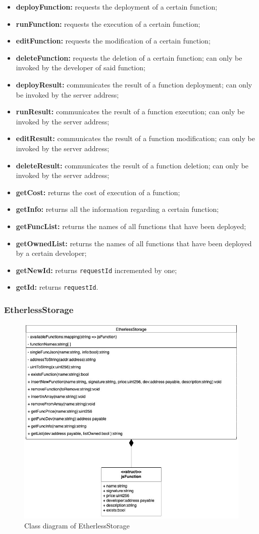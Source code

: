 	\begin{itemize}
		\item \textbf{deployFunction:} requests the deployment of a certain function;
		\item \textbf{runFunction:} requests the execution of a certain function;
		\item \textbf{editFunction:} requests the modification of a certain function;
		\item \textbf{deleteFunction:} requests the deletion of a certain function; can only be invoked by the developer of said function;
		\item \textbf{deployResult:} communicates the result of a function deployment; can only be invoked by the server address;
		\item \textbf{runResult:} communicates the result of a function execution; can only be invoked by the server address;
		\item \textbf{editResult:} communicates the result of a function modification; can only be invoked by the server address;
		\item \textbf{deleteResult:} communicates the result of a function deletion; can only be invoked by the server address;
		\item \textbf{getCost:} returns the cost of execution of a function;
		\item \textbf{getInfo:} returns all the information regarding a certain function;
		\item \textbf{getFuncList:} returns the names of all functions that have been deployed;
		\item \textbf{getOwnedList:} returns the names of all functions that have been deployed by a certain developer;
		\item \textbf{getNewId:} returns \texttt{requestId} incremented by one;
		\item \textbf{getId:} returns \texttt{requestId}.
	\end{itemize}

\subsubsection{EtherlessStorage}
	\begin{figure}[H]
		\centering
		\includegraphics[width=0.6\linewidth]{diagrammi/etherless-smart/EtherlessStorage.jpg}
		\caption{Class diagram of EtherlessStorage}
	\end{figure}

